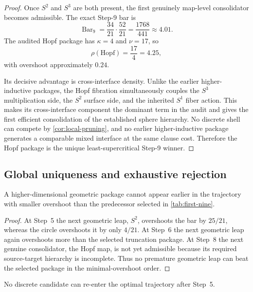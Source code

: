 \documentclass{lmcs}
\newcommand{\SelBar}{\operatorname{Bar}}
\begin{document}
\begin{proof}
Once $S^2$ and $S^3$ are both present, the first genuinely map-level consolidator becomes admissible. The exact Step-9 bar is
\[
  \SelBar_9 = \frac{34}{21}\cdot\frac{52}{21} = \frac{1768}{441} \approx 4.01.
\]
The audited Hopf package has $\kappa=4$ and $\nu=17$, so
\[
  \rho(\mathrm{Hopf})=\frac{17}{4}=4.25,
\]
with overshoot approximately $0.24$.

Its decisive advantage is cross-interface density. Unlike the earlier higher-inductive packages, the Hopf fibration simultaneously couples the $S^3$ multiplication side, the $S^2$ surface side, and the inherited $S^1$ fiber action. This makes its cross-interface component the dominant term in the audit and gives the first efficient consolidation of the established sphere hierarchy. No discrete shell can compete by \autoref{cor:local-pruning}, and no earlier higher-inductive package generates a comparable mixed interface at the same clause cost. Therefore the Hopf package is the unique least-supercritical Step-9 winner.
\end{proof}

\subsection{Global uniqueness and exhaustive rejection}

\begin{lem}
\label{lem:no-leap}
A higher-dimensional geometric package cannot appear earlier in the trajectory with smaller overshoot than the predecessor selected in \autoref{tab:first-nine}.
\end{lem}

\begin{proof}
At Step~5 the next geometric leap, $S^2$, overshoots the bar by $25/21$, whereas the circle overshoots it by only $4/21$. At Step~6 the next geometric leap again overshoots more than the selected truncation package. At Step~8 the next genuine consolidator, the Hopf map, is not yet admissible because its required source-target hierarchy is incomplete. Thus no premature geometric leap can beat the selected package in the minimal-overshoot order.
\end{proof}

\begin{lem}
\label{lem:no-regression}
No discrete candidate can re-enter the optimal trajectory after Step~5.
\end{lem}
\end{document}
